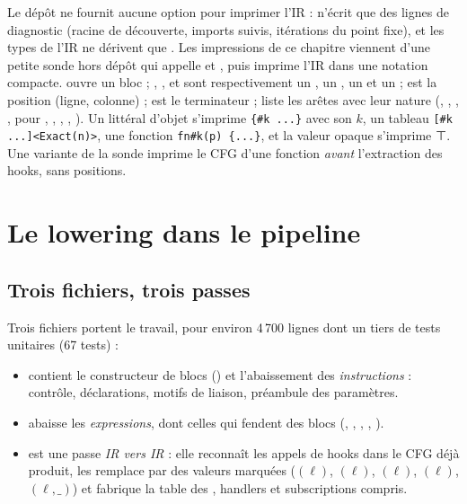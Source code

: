 \begin{remarque}
Le dépôt ne fournit aucune option pour imprimer l'IR :  n'écrit que des lignes de diagnostic (racine de découverte, imports suivis, itérations du point fixe), et les types de l'IR ne dérivent que . Les impressions de ce chapitre viennent d'une petite sonde hors dépôt qui appelle  et , puis imprime l'IR dans une notation compacte.  ouvre un bloc ; , ,  et  sont respectivement un , un , un  et un  ;  est la position (ligne, colonne) ;  est le terminateur ;  liste les arêtes avec leur nature (, , , ,  pour , , , , ). Un littéral d'objet s'imprime \texttt{\{\#k ...\}} avec son  $k$, un tableau \texttt{[\#k ...]<Exact(n)>}, une fonction \texttt{fn\#k(p) \{...\}}, et la valeur opaque  s'imprime ⊤. Une variante  de la sonde imprime le CFG d'une fonction \emph{avant} l'extraction des hooks, sans positions.
\end{remarque}

\section{Le lowering dans le pipeline}
\label{sec:lowering-pipeline}

\subsection{Trois fichiers, trois passes}

Trois fichiers portent le travail, pour environ 4\,700 lignes dont un tiers de tests unitaires (67 tests) :

\begin{itemize}
  \item {} contient le constructeur de blocs () et l'abaissement des \emph{instructions} : contrôle, déclarations, motifs de liaison, préambule des paramètres.
  \item {} abaisse les \emph{expressions}, dont celles qui fendent des blocs (, \code{&&}, \code{||}, , ).
  \item {} est une passe \emph{IR vers IR} : elle reconnaît les appels de hooks dans le CFG déjà produit, les remplace par des valeurs marquées ($(\ell)$, $(\ell)$, $(\ell)$, $(\ell)$, $(\ell, \_)$) et fabrique la table des , handlers et subscriptions compris.
\end{itemize}

